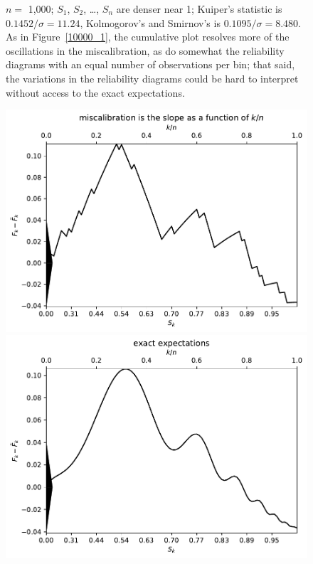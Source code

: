 \documentclass{article}
\begin{document}
\begin{figure}
\begin{centering}
\end{centering}
\caption{$n =$ 1,000; $S_1$, $S_2$, \dots, $S_n$ are denser near 1;
         Kuiper's statistic is $0.1452 / \sigma = 11.24$,
         Kolmogorov's and Smirnov's is $0.1095 / \sigma = 8.480$.
As in Figure~\ref{10000_1},
the cumulative plot resolves more of the oscillations in the miscalibration,
as do somewhat the reliability diagrams with an equal number
of observations per bin; that said, the variations in the reliability diagrams
could be hard to interpret without access to the exact expectations.
}
\label{1000_1}
\end{figure}


\begin{figure}
\begin{centering}

\parbox{\imsize}{\includegraphics[width=\imsize]
                {./codes/unweighted/100_4_2_1/cumulative.pdf}}
\quad\quad
\parbox{\imsize}{\includegraphics[width=\imsize]
                {./codes/unweighted/100_4_2_1/cumulative_exact.pdf}}


\end{centering}
\end{figure}
\end{document}
